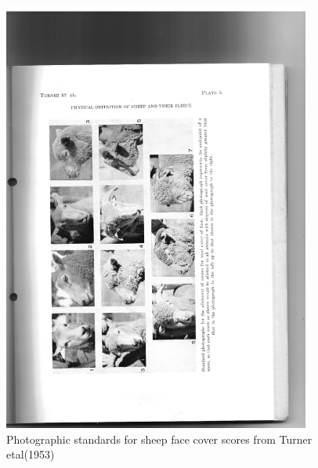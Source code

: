 %

\begin{figure}[!h]
  \centering
   \includegraphics[width=0.9\textwidth]{face.png}
  \caption{Photographic standards for sheep face cover scores from Turner etal(1953)~\cite{turn:53}}
  \label{fig:face}
\end{figure}

%

